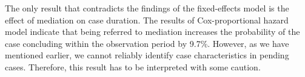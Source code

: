 The only result that contradicts the findings of the fixed-effects model is the effect of mediation on case duration. The results of Cox-proportional hazard model indicate that being referred to mediation increases the probability of the case concluding within the observation period by 9.7\%. However, as we have mentioned earlier, we cannot reliably identify case characteristics in pending cases. Therefore, this result has to be interpreted with some caution.

